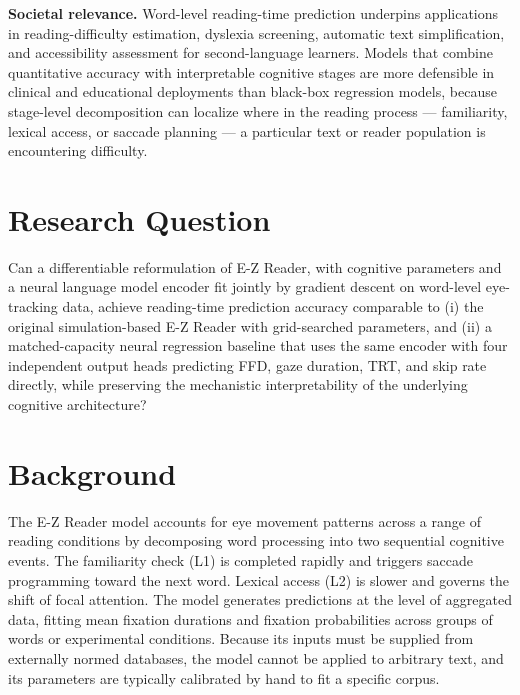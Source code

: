 \documentclass[12pt]{article}
\begin{document}
\noindent\textbf{Societal relevance.} Word-level reading-time prediction
underpins applications in reading-difficulty estimation, dyslexia screening,
automatic text simplification, and accessibility assessment for second-language
learners. Models that combine quantitative accuracy with interpretable
cognitive stages are more defensible in clinical and educational deployments
than black-box regression models, because stage-level decomposition can
localize where in the reading process --- familiarity, lexical access, or
saccade planning --- a particular text or reader population is encountering
difficulty.

\section{Research Question}

Can a differentiable reformulation of E-Z Reader, with cognitive parameters
and a neural language model encoder fit jointly by gradient descent on
word-level eye-tracking data, achieve reading-time prediction accuracy
comparable to (i) the original simulation-based E-Z Reader
\citep{reichle1998toward} with grid-searched parameters, and (ii) a
matched-capacity neural regression baseline that uses the same encoder with
four independent output heads predicting FFD, gaze duration, TRT, and skip
rate directly, while preserving the mechanistic interpretability of the
underlying cognitive architecture?

\section{Background}

The E-Z Reader model \citep{reichle1998toward} accounts for eye movement
patterns across a range of reading conditions by decomposing word processing
into two sequential cognitive events. The familiarity check (L1) is completed
rapidly and triggers saccade programming toward the next word. Lexical access
(L2) is slower and governs the shift of focal attention. The model generates
predictions at the level of aggregated data, fitting mean fixation durations
and fixation probabilities across groups of words or experimental conditions.
Because its inputs must be supplied from externally normed databases, the model
cannot be applied to arbitrary text, and its parameters are typically
calibrated by hand to fit a specific corpus.
\end{document}
